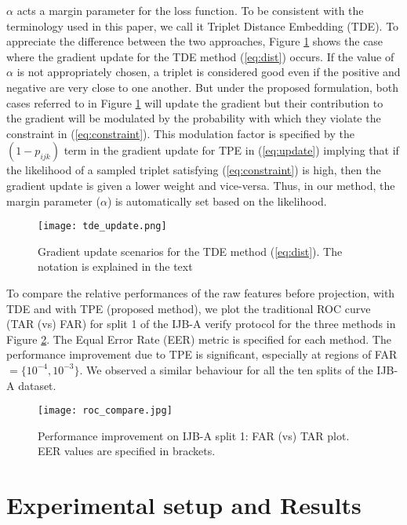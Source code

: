 \documentclass[10pt,twocolumn,letterpaper]{article}
\begin{document}
$\alpha$ acts a margin parameter for the loss function. To be consistent with
the terminology used in this paper, we call it Triplet Distance Embedding (TDE). To appreciate the difference between the two approaches, Figure \ref{fig:tde} shows the case where the gradient update for the TDE method
(\ref{eq:dist}) occurs. If the value of $\alpha$ is not appropriately chosen, a triplet is considered good even if the positive and negative are very
close to one another. But under the proposed formulation, both cases referred to
in Figure \ref{fig:tde} will update the gradient but their contribution to the
gradient will be modulated by the probability with which they violate the
constraint in  (\ref{eq:constraint}). This modulation factor is specified by the
$(1-p_{ijk})$ term in the gradient update for TPE in (\ref{eq:update}) implying
that if the likelihood of a sampled triplet satisfying (\ref{eq:constraint}) is
high, then the gradient update is given a lower weight and vice-versa. Thus, in
our method, the margin parameter ($\alpha$) is automatically set based on the
likelihood. \\


\begin{figure}
\centering
\texttt{[image: tde\_update.png]}
\caption{Gradient update scenarios for the TDE method (\ref{eq:dist}). The notation is explained in the text}
\label{fig:tde}
\end{figure}



To compare the relative performances of the raw features before projection, with
TDE and with TPE (proposed method), we plot the traditional ROC curve (TAR (vs)
FAR) for split 1 of the IJB-A verify protocol for the three methods in Figure
\ref{fig:tl}. The Equal Error Rate (EER) metric is specified for each method. The performance
improvement due to TPE is significant, especially at regions of
FAR$=\{10^{-4},10^{-3}\}$. We observed a similar behaviour for all the ten
splits of the IJB-A dataset. 

\begin{figure}
\texttt{[image: roc\_compare.jpg]}
\caption{Performance improvement on IJB-A split 1: FAR (vs) TAR plot. EER values are specified in brackets.}
\label{fig:tl}
\end{figure}

 \section{Experimental setup and Results}\label{sec:results}
\end{document}
